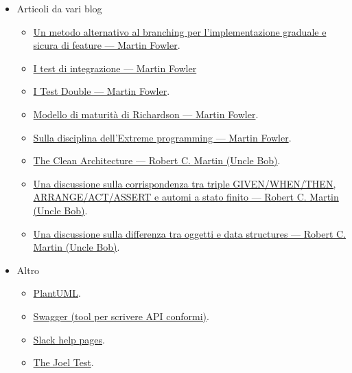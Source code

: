 \documentclass[../norme-di-progetto.tex]{subfiles}
\begin{document}
\begin{itemize}
  \item Articoli da vari blog
        \begin{itemize}
          \item \href{https://martinfowler.com/articles/feature-toggles.html}{Un metodo alternativo al branching per l'implementazione graduale e sicura di feature --- Martin Fowler}.
          \item \href{https://martinfowler.com/bliki/IntegrationTest.html}{I test di integrazione --- Martin Fowler}
          \item\href{https://martinfowler.com/articles/mocksArentStubs.html}{I Test Double --- Martin Fowler}.
          \item \href{https://martinfowler.com/articles/richardsonMaturityModel.html}{Modello di maturità di Richardson --- Martin Fowler}.
          \item \href{https://martinfowler.com/bliki/BeckDesignRules.html}{Sulla disciplina dell'Extreme programming --- Martin Fowler}.
          \item \href{https://blog.cleancoder.com/uncle-bob/2012/08/13/the-clean-architecture.html}{The Clean Architecture --- Robert C. Martin (Uncle Bob)}.
          \item \href{https://blog.cleancoder.com/uncle-bob/2018/06/06/PickledState.html}{Una discussione sulla corrispondenza tra triple GIVEN/WHEN/THEN, ARRANGE/ACT/ASSERT e automi a stato finito --- Robert C. Martin (Uncle Bob)}.
          \item \href{https://blog.cleancoder.com/uncle-bob/2019/06/16/ObjectsAndDataStructures.html}{Una discussione sulla differenza tra oggetti e data structures --- Robert C. Martin (Uncle Bob)}.
        \end{itemize}

  \item Altro
        \begin{itemize}
          \item \href{https://plantuml.com/}{PlantUML}.
          \item \href{https://swagger.io/}{Swagger (tool per scrivere API conformi)}.
          \item \href{https://slack.com/intl/en-it/help}{Slack help pages}.
          \item \href{https://www.joelonsoftware.com/2000/08/09/the-joel-test-12-steps-to-better-code/}{The Joel Test}.
        \end{itemize}
\end{itemize}

\end{document}
